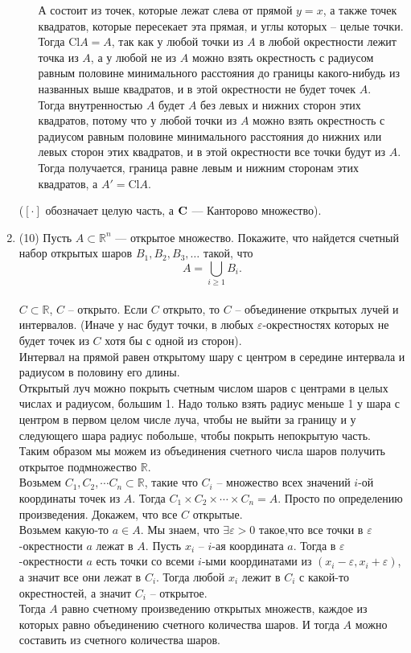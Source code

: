 \documentclass[a4paper]{article}
\def\eps{\varepsilon}
\def\Cl{\mathrm{Cl}}
\begin{document}
\begin{enumerate}
\begin{enumerate}
        А состоит из точек, которые лежат слева от прямой $y=x$, а также точек квадратов, которые пересекает эта прямая, и углы которых -- целые точки.\\
        Тогда $\Cl A = A$, так как у любой точки из $A$ в любой окрестности лежит точка из $A$, а у любой не из $A$ можно взять окрестность с радиусом равным половине минимального расстояния до границы какого-нибудь из названных выше квадратов, и в этой окрестности не будет точек $A$.\\
        Тогда внутренностью $A$ будет $A$ без левых и нижних сторон этих квадратов, потому что у любой точки из $A$ можно взять окрестность с радиусом равным половине минимального расстояния до нижних или левых сторон этих квадратов, и в этой окрестности все точки будут из $A$.\\
        Тогда получается, граница равне левым и нижним сторонам этих квадратов, а $A' = \Cl A$.
    \end{enumerate}
    ($[\cdot]$ обозначает целую часть, а $\mathrm{\bf C}$ --- Канторово множество).
    
    \item (10) Пусть $A\subset \mathbb R^n$ --- открытое множество. Покажите, что найдется счетный набор открытых шаров $B_1,B_2,B_3,\dots$ такой, что
    \[
        A = \bigcup_{i\geq 1} B_i.
    \]\\
    $C\subset \mathbb R$, $C$ -- открыто. Если $C$ открыто, то $C$ -- объединение открытых лучей и интервалов. (Иначе у нас будут точки, в любых $\eps$-окрестностях которых не будет точек из $C$ хотя бы с одной из сторон).\\
    Интервал на прямой равен открытому шару с центром в середине интервала и радиусом в половину его длины.\\
    Открытый луч можно покрыть счетным числом шаров с центрами в целых числах и радиусом, большим 1. Надо только взять радиус меньше 1 у шара с центром в первом целом числе луча, чтобы не выйти за границу и у следующего шара радиус побольше, чтобы покрыть непокрытую часть.\\
    Таким образом мы можем из объединения счетного числа шаров получить открытое подмножество $\mathbb R$.\\
    Возьмем $C_1, C_2, \cdots C_n \subset \mathbb R$, такие что $C_i$ -- множество всех значений $i$-ой координаты точек из $A$. Тогда $C_1\times C_2\times \cdots\times C_n = A$. Просто по определению произведения. Докажем, что все $C$ открытые.\\
    Возьмем какую-то $a \in A$. Мы знаем, что $\exists \eps > 0$ такое,что все точки в $\eps$-окрестности $a$ лежат в $A$. Пусть $x_i$ -- $i$-ая координата $a$. Тогда в $\eps$-окрестности $a$ есть точки со всеми $i$-ыми координатами из $(x_i-\eps, x_i+\eps)$, а значит все они лежат в $C_i$. Тогда любой $x_i$ лежит в $C_i$ с какой-то окрестностей, а значит $C_i$ -- открытое.\\
    Тогда $A$ равно счетному произведению открытых множеств, каждое из которых равно объединению счетного количества шаров. И тогда $A$ можно составить из счетного количества шаров.
    

\end{enumerate}
\end{document}
